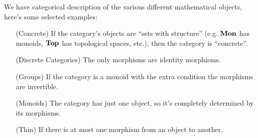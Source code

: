 
We have categorical description of the various different
mathematical objects, here's some selected examples:
\begin{enumerate}
\item[(Concrete)] If the category's objects are ``sets with
  structure'' (e.g. $\mathbf{Mon}$ has monoids, $\mathbf{Top}$ has
  topological spaces, etc.), then the category is ``concrete''. 
\item[(Discrete Categories)] The only morphisms are identity
  morphisms.
\item[(Groups)] If the category is a monoid with the extra
  condition the morphisms are invertible.
\item[(Monoids)] The category has just one object, so it's completely
  determined by its morphisms.
\item[(Thin)] If there is at most one morphism from an object to another.
\end{enumerate}

